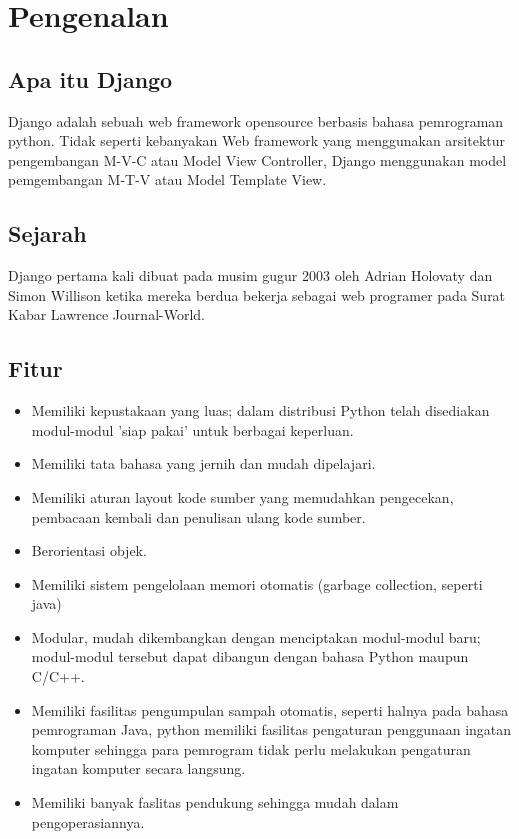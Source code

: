 \setcounter{page}{1}
\section{Pengenalan}
\subsection{Apa itu Django}
Django adalah sebuah web framework opensource berbasis bahasa pemrograman python. Tidak seperti kebanyakan Web framework
yang menggunakan arsitektur pengembangan M-V-C atau Model View Controller, Django menggunakan model pemgembangan 
M-T-V atau Model Template View. 

\subsection{Sejarah}
Django pertama kali dibuat pada musim gugur 2003 oleh Adrian Holovaty dan Simon Willison ketika mereka berdua bekerja sebagai web programer 
pada Surat Kabar Lawrence Journal-World.
\subsection{Fitur}

\begin{itemize}
    \item Memiliki kepustakaan yang luas; dalam distribusi Python telah disediakan modul-modul 'siap pakai' untuk berbagai keperluan.
    \item Memiliki tata bahasa yang jernih dan mudah dipelajari.
    \item Memiliki aturan layout kode sumber yang memudahkan pengecekan, pembacaan kembali dan penulisan ulang kode sumber.
    \item Berorientasi objek.
    \item Memiliki sistem pengelolaan memori otomatis (garbage collection, seperti java)
    \item Modular, mudah dikembangkan dengan menciptakan modul-modul baru; modul-modul tersebut dapat dibangun dengan bahasa Python maupun C/C++.
    \item Memiliki fasilitas pengumpulan sampah otomatis, seperti halnya pada bahasa pemrograman Java, python memiliki fasilitas pengaturan penggunaan ingatan komputer sehingga para pemrogram tidak perlu melakukan pengaturan ingatan komputer secara langsung.
    \item Memiliki banyak faslitas pendukung sehingga mudah dalam pengoperasiannya.
\end{itemize}

